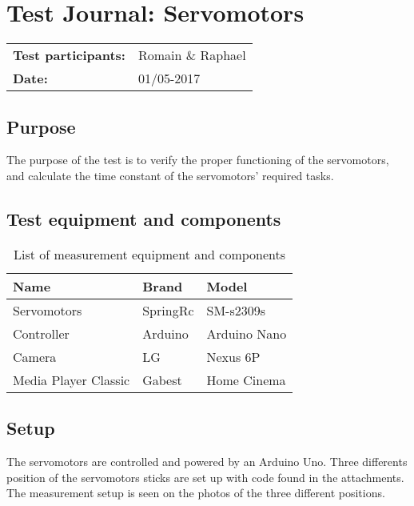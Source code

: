 \graphicspath{{figures/design/}}


\chapter{Test Journal: Servomotors}
\label{ssc:Servomotors}

\begin{table}[!h]
\begin{tabular}{l l}
\textbf{Test participants:} & Romain \& Raphael   \\
\textbf{Date:}  & 01/05-2017
\end{tabular}
\end{table}

\section*{Purpose}
	
The purpose of the test is to verify the proper functioning of the servomotors, and calculate the time constant of the servomotors' required tasks.
	
\section*{Test equipment and components}


\begin{table}[htbp]
	\centering
	\caption{List of measurement equipment and components}\label{tab_appendix:Servo_equip2}
	
	\begin{tabularx}{\textwidth}{lXX}
		Name & Brand	& Model \\ \toprule 
		Servomotors	& SpringRc & SM-s2309s 	\\ \rowcolor{lightGrey}
		Controller	& Arduino & Arduino Nano \\ 
		Camera & LG & Nexus 6P \\ \rowcolor{lightGrey}
		Media Player Classic & Gabest & Home Cinema\\ 
	\end{tabularx}
\end{table}




	\section*{Setup}
	
The servomotors are controlled and powered by an Arduino Uno. Three differents position of the servomotors sticks are set up with code found in the attachments. The measurement setup is seen on the photos of the three different positions. \

